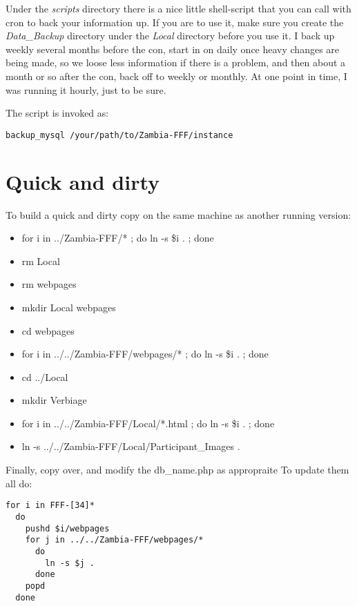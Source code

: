 \documentclass[tablesignature]{scrartcl}
\begin{document}
  Under the \emph{scripts} directory there is a nice little shell-script
  that you can call with cron to back your information up.  If you are
  to use it, make sure you create the \emph{Data\_{}Backup} directory under
  the \emph{Local} directory before you use it.  I back up weekly several
  months before the con, start in on daily once heavy changes are
  being made, so we loose less information if there is a problem, and
  then about a month or so after the con, back off to weekly or
  monthly.  At one point in time, I was running it hourly, just to be
  sure.

  The script is invoked as:
\begin{verbatim}
backup_mysql /your/path/to/Zambia-FFF/instance
\end{verbatim}
\section{Quick and dirty}
\label{sec-10}

  To build a quick and dirty copy on the same machine as another running version: 
\begin{itemize}
\item for i in ../Zambia-FFF/* ; do ln -s \$i . ; done
\item rm Local
\item rm webpages
\item mkdir Local webpages
\item cd webpages
\item for i in ../../Zambia-FFF/webpages/* ; do ln -s \$i . ; done
\item cd ../Local
\item mkdir Verbiage
\item for i in ../../Zambia-FFF/Local/*.html ; do ln -s \$i . ; done
\item ln -s ../../Zambia-FFF/Local/Participant\_{}Images .
\end{itemize}

  Finally, copy over, and modify the db\_{}name.php as appropraite
  To update them all do:
\begin{verbatim}
for i in FFF-[34]*
  do 
    pushd $i/webpages
    for j in ../../Zambia-FFF/webpages/*
      do 
        ln -s $j .
      done
    popd
  done
\end{verbatim}
\end{document}
